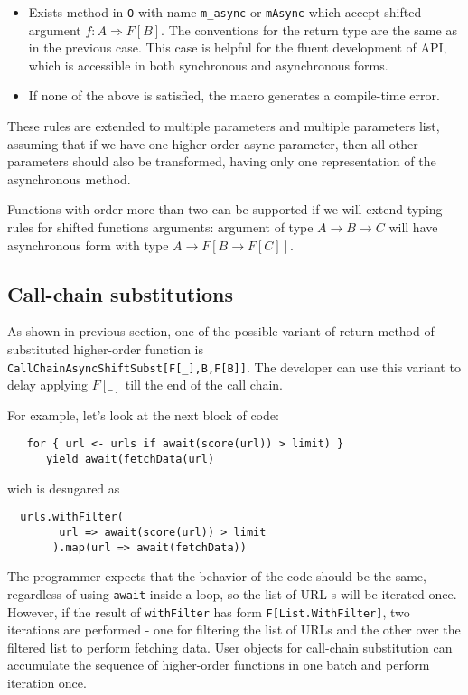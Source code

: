 \documentclass{llncs}
\begin{document}
\begin{itemize}

 \item Exists method in \lstinline|O| with name \lstinline|m_async| or \lstinline|mAsync| which accept shifted argument $f: A \Rightarrow F[B]$. The conventions for the return type are the same as in the previous case.  This case is helpful for the fluent development of API, which is accessible in both synchronous and asynchronous forms. 

 \item If none of the above is satisfied, the macro generates a compile-time error.

\end{itemize}

These rules are extended to multiple parameters and multiple parameters list, assuming that if we have one higher-order async parameter, then all other parameters should also be transformed, having only one representation of the asynchronous method.

Functions with order more than two can be supported if we will extend typing rules for shifted functions arguments:  argument of type $A\to B\to C$ will have asynchronous form with type $A\to F[B \to F[C]]$.
 
\subsection{ Call-chain substitutions }
 As shown in previous section, one of the possible variant of return method of substituted higher-order function is 
  \\
  \lstinline|CallChainAsyncShiftSubst[F[_],B,F[B]]|. 
The developer can use this variant to delay applying $F[\_]$  till the end of the call chain.

For example, let's look at the next block of code:

\begin{lstlisting}
   for { url <- urls if await(score(url)) > limit) }
      yield await(fetchData(url)
\end{lstlisting}
wich is desugared as 
\begin{lstlisting}
  urls.withFilter(
        url => await(score(url)) > limit
       ).map(url => await(fetchData))
\end{lstlisting}

The programmer expects that the behavior of the code should be the same, regardless of using \lstinline|await| inside a loop, so the list of URL-s will be iterated once.  However, if the result of \lstinline|withFilter| has form \lstinline|F[List.WithFilter]|, two iterations are performed - one for filtering the list of URLs and the other over the filtered list to perform fetching data.   User objects for call-chain substitution can accumulate the sequence of higher-order functions in one batch and perform iteration once. 
\end{document}
